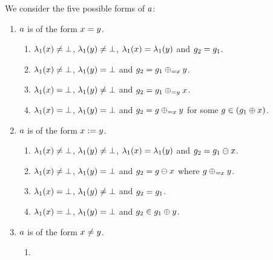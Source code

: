 {\begin{enumerate}
We consider
the five possible forms of $a$:
%
%
\begin{enumerate}
\item $a$ is of the form $x=y$.
  \begin{enumerate}
  \item
    \label{pre:case:equalsA}%
    $\lambda_1(x)\neq\bot$, %
    $\lambda_1(y)\neq\bot$, %
    $\lambda_1(x)=\lambda_1(y)$ and $g_2=g_1$.
  \item
    \label{pre:case:equalsB}%
    $\lambda_1(x)\neq\bot$, %
    $\lambda_1(y)=\bot$ and
    $g_2=g_1\oplus_{={x}}{y}$.
  \item
    \label{pre:case:equalsC}%
    $\lambda_1(x)=\bot$, %
    $\lambda_1(y)\neq\bot$ and
    $g_2=g_1\oplus_{={y}}{x}$.
  \item
    \label{pre:case:equalsD}%
    $\lambda_1(x)=\bot$, %
    $\lambda_1(y)=\bot$ and
    $g_2=g\oplus_{={x}}{y}$ for some
    $g\in\left(g_1\oplus{\ensuremath{x}}\right)$.
  \end{enumerate}
\item $a$ is of the form $x:=y$.
%
  \begin{enumerate}
  \item \label{pre:case:assignedA}%
    $\lambda_1(x)\neq\bot$, %
    $\lambda_1(y)\neq\bot$, %
    $\lambda_1(x)=\lambda_1(y)$ and
    $g_2=g_1\ominus{\ensuremath{x}}$.
  \item \label{pre:case:assignedB}%
    $\lambda_1(x)\neq\bot$, %
    $\lambda_1(y)=\bot$ and
    $g_2=g\ominus{\ensuremath{x}}$ where $g\oplus_{={x}}{y}$.
  \item \label{pre:case:assignedC}%
    $\lambda_1(x)=\bot$, %
    $\lambda_1(y)\neq\bot$ and %
    $g_2=g_1$.
  \item \label{pre:case:assignedD}%
    $\lambda_1(x)=\bot$, %
    $\lambda_1(y)=\bot$ and %
    $g_2\in g_1\oplus{\ensuremath{y}}$.
  \end{enumerate}
\item $a$ is of the form $x\neq y$.
  \begin{enumerate}
  \item \label{pre:case:notEqualsA}%

\end{enumerate}
\end{enumerate}
\end{enumerate}}
